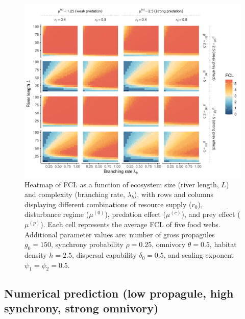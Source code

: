 \begin{figure}
\centering
\includegraphics{../data_fmt/fig_rho025_g150_theta05.pdf}
\caption{Heatmap of FCL as a function of ecosystem size (river length,
\(L\)) and complexity (branching rate, \(\lambda_b\)), with rows and
columns displaying different combinations of resource supply (\(r_0\)),
disturbance regime (\(\mu^{(0)}\)), predation effect (\(\mu^{(c)}\)),
and prey effect (\(\mu^{(p)}\)). Each cell represents the average FCL of
five food webs. Additional parameter values are: number of gross
propagules \(g_0=150\), synchrony probability \(\rho=0.25\), omnivory
\(\theta=0.5\), habitat density \(h=2.5\), dispersal capability
\(\delta_0=0.5\), and scaling exponent \(\psi_1=\psi_2=0.5\).}
\end{figure}

\newpage

\subsection*{Numerical prediction (low propagule, high synchrony, strong
omnivory)}\label{numerical-prediction-low-propagule-high-synchrony-strong-omnivory}

